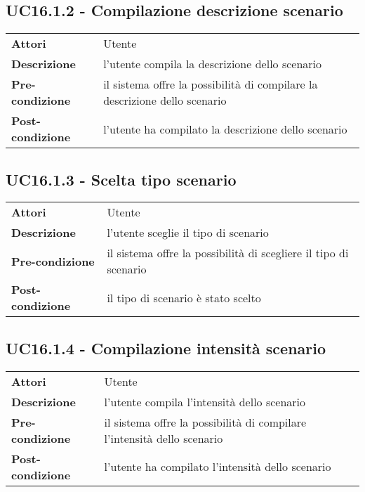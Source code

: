 \subsection{UC16.1.2 - Compilazione descrizione scenario}
\label{sssec:UC16.1.2}
\def\arraystretch{1.5}
\begin{tabularx}{\textwidth}{l|p{}}
\rowcolor{I} \multicolumn{2}{c}{\color{white}\textbf{UC16.1.2 - Compilazione descrizione scenario}} \\
\toprule
\endhead
\textbf{Attori} & Utente\\
\textbf{Descrizione} & l'utente compila la descrizione dello scenario\\
\textbf{Pre-condizione} & il sistema offre la possibilità di compilare la descrizione dello scenario\\
\textbf{Post-condizione} & l'utente ha compilato la descrizione dello scenario\\
\bottomrule
\end{tabularx}
\subsection{UC16.1.3 - Scelta tipo scenario}
\label{sssec:UC16.1.3}
\def\arraystretch{1.5}
\begin{tabularx}{\textwidth}{l|p{}}
\rowcolor{I} \multicolumn{2}{c}{\color{white}\textbf{UC16.1.3 - Scelta tipo scenario}} \\
\toprule
\endhead
\textbf{Attori} & Utente\\
\textbf{Descrizione} & l'utente sceglie il tipo di scenario\\
\textbf{Pre-condizione} & il sistema offre la possibilità di scegliere il tipo di scenario\\
\textbf{Post-condizione} & il tipo di scenario è stato scelto\\
\bottomrule
\end{tabularx}
\subsection{UC16.1.4 - Compilazione intensità scenario}
\label{sssec:UC16.1.4}
\def\arraystretch{1.5}
\begin{tabularx}{\textwidth}{l|p{}}
\rowcolor{I} \multicolumn{2}{c}{\color{white}\textbf{UC16.1.4 - Compilazione intensità scenario}} \\
\toprule
\endhead
\textbf{Attori} & Utente\\
\textbf{Descrizione} & l'utente compila l'intensità dello scenario\\
\textbf{Pre-condizione} & il sistema offre la possibilità di compilare l'intensità dello scenario\\
\textbf{Post-condizione} & l'utente ha compilato l'intensità dello scenario\\
\bottomrule
\end{tabularx}

